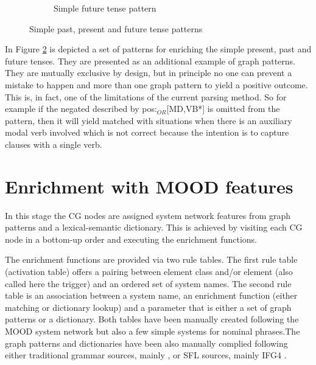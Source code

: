 \begin{figure}[!ht]
\begin{subfigure}[t]{0.47\textwidth}
            \caption{Simple future tense pattern}
            \label{fig:future-tense-pattern1}
        \end{subfigure}
        \caption{Simple past, present and future tense patterns}
        \label{fig:simple-tense-pattern1}
    \end{figure}

    In Figure \ref{fig:simple-tense-pattern1} is depicted a set of patterns for enriching the simple present, past and future tenses. They are presented as an additional example of graph patterns. They are mutually exclusive by design, but in principle no one can prevent a mistake to happen and more than one graph pattern to yield a positive outcome. This is, in fact, one of the limitations of the current parsing method. So for example if the negated described by pos:$_{OR}$[MD,VB*] is omitted from the pattern, then it will yield matched with situations when there is an auxiliary modal verb involved which is not correct because the intention is to capture clauses with a single verb. 

\section{Enrichment with MOOD features}
\label{sec:enrichment-stage}

In this stage the CG nodes are assigned system network features from graph patterns and a lexical-semantic dictionary. This is achieved by visiting each CG node in a bottom-up order and executing the enrichment functions. 

The enrichment functions are provided via two rule tables. The first rule table (activation table) offers a pairing between element class and/or element (also called here the trigger) and an ordered set of system names. The second rule table is an association between a system name, an enrichment function (either matching or dictionary lookup) and a parameter that is either a set of graph patterns or a dictionary. Both tables have been manually created following the MOOD system network but also a few simple systems for nominal phrases.The graph patterns and dictionaries have been also manually complied following either traditional grammar sources, mainly \citet{Quirk1985}, or SFL sources, mainly IFG4 \citep{Halliday2013}. 

